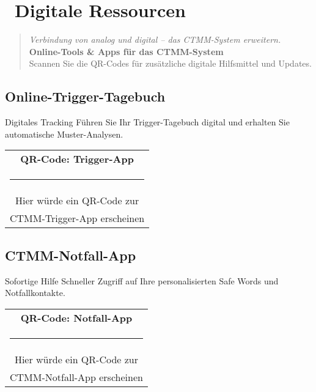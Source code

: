
\newpage
\section*{\textcolor{ctmmPurple}{\faQrcode~Digitale Ressourcen}}
\label{sec:qrcode}

\begin{quote}
\textit{\textcolor{ctmmOrange}{Verbindung von analog und digital -- das CTMM-System erweitern.}}\\
\textbf{\textcolor{ctmmPurple}{Online-Tools \& Apps für das CTMM-System}}\\
Scannen Sie die QR-Codes für zusätzliche digitale Hilfsmittel und Updates.
\end{quote}

\subsection*{\textcolor{ctmmPurple}{Online-Trigger-Tagebuch}}

\begin{ctmmBlueBox}{Digitales Tracking}
Führen Sie Ihr Trigger-Tagebuch digital und erhalten Sie automatische Muster-Analysen.

\begin{center}
\begin{tabular}{c}
\textbf{QR-Code: Trigger-App}\\
\rule{3cm}{3cm}\\
\small{Hier würde ein QR-Code zur}\\
\small{CTMM-Trigger-App erscheinen}
\end{tabular}
\end{center}
\end{ctmmBlueBox}

\subsection*{\textcolor{ctmmPurple}{CTMM-Notfall-App}}

\begin{ctmmRedBox}{Sofortige Hilfe}
Schneller Zugriff auf Ihre personalisierten Safe Words und Notfallkontakte.

\begin{center}
\begin{tabular}{c}
\textbf{QR-Code: Notfall-App}\\
\rule{3cm}{3cm}\\
\small{Hier würde ein QR-Code zur}\\
\small{CTMM-Notfall-App erscheinen}
\end{tabular}
\end{center}
\end{ctmmRedBox}

